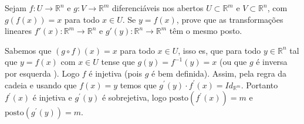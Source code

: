 \begin{homeworkProblem}[Seção 2-4]
  Sejam $f : U \to \mathbb{R}^n$ e $g : V \to \mathbb{R}^m$ diferenciáveis nos abertos $U \subset \mathbb{R}^m$ e $V \subset \mathbb{R}^n$, com $g(f(x)) = x$ para todo $x \in U$. Se $y = f(x)$, prove que as transformações lineares $f'(x) : \mathbb{R}^m \to \mathbb{R}^n$ e $g'(y) : \mathbb{R}^n \to \mathbb{R}^m$ têm o mesmo posto.
  \begin{solution}
    Sabemos que $(g\circ f)(x)=x$ para todo $x\in U$, isso es, que para todo $y\in \mathbb{R}^{n}$ tal que $y=f(x)$ com $x\in U$ tense que $g(y)=f^{-1}(y)=x$ (ou que $g$ é inversa por esquerda ). Logo $f$ é injetiva (pois $g$ é bem definida). Assim, pela regra da cadeia e usando que $f(x)=y$ temos que $g^{\prime}(y)\cdot f^{\prime}(x)=Id_{\mathbb{R}^{m}}$. Portanto $f^{\prime}(x)$ é injetiva e $g^{\prime}(y)$ é sobrejetiva, logo $\text{posto}(f^{\prime}(x))=m$ e $\text{posto}(g^{\prime}(y))=m$. 
  \end{solution}
\end{homeworkProblem}
